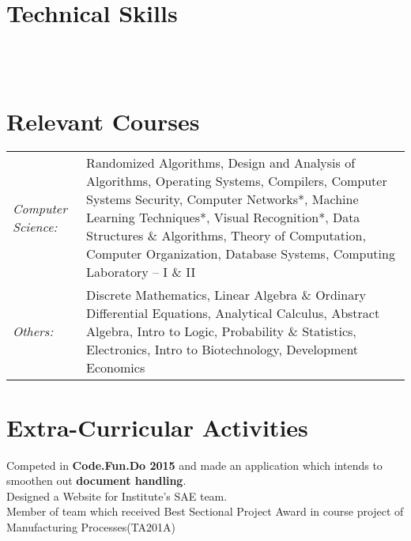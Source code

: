 \documentclass[a4paper]{norm-resume}
\begin{document}
\vspace{2mm}    %


\section{Technical Skills \hrulefill}

\vspace{2mm}

 \hfill {} \\
 \hfill {} \\
 \hfill {}

\vspace{2mm}    %


\section{Relevant Courses \hrulefill}

\vspace{2mm}

    \begin{tabular}{lp{15cm}}

	\normalsize\emph{Computer Science:} & \small{Randomized Algorithms, Design and Analysis of Algorithms, Operating Systems, Compilers, Computer Systems Security, Computer Networks*, Machine Learning Techniques*, Visual Recognition*, Data Structures \& Algorithms, Theory of Computation, Computer Organization, Database Systems, Computing Laboratory – I \& II} \\
	\normalsize\emph{Others:} & \small{Discrete Mathematics, Linear Algebra \& Ordinary Differential Equations, Analytical Calculus, Abstract Algebra, Intro to Logic, Probability \& Statistics, Electronics, Intro to Biotechnology, Development Economics}
    \end{tabular}

\vspace{2mm}    %


\section{Extra-Curricular Activities \hrulefill}
\vspace{2mm}

    Competed in \textbf{Code.Fun.Do 2015} and made an application which intends to smoothen out \textbf{document handling}. \\
    Designed a Website for Institute’s SAE team. \\
    Member of team which received Best Sectional Project Award in course project of Manufacturing Processes(TA201A)
\end{document}
